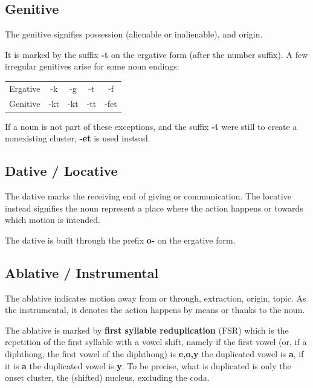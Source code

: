\documentclass[10pt,oneside]{memoir}
\begin{document}
\begin{multicols}{2}
\subsection{Genitive}

The genitive signifies possession (alienable or inalienable), and origin.

It is marked by the suffix \textbf{-t} on the ergative form (after the number suffix). A few irregular genitives arise for some noun endings:

\begin{center}
\begin{tabular}{c || c | c | c | c}
Ergative & -k & -g & -t & -f\\
Genitive & -kt & -kt & -tt & -fet
\end{tabular}
\end{center}



If a noun is not part of these exceptions, and the suffix \textbf{-t} were still to create a nonexisting cluster, \textbf{-et} is used instead.

\subsection{Dative / Locative}

The dative marks the receiving end of giving or communication. The locative instead signifies the noun represent a place where the action happens or towards which motion is intended.

The dative is built through the prefix \textbf{o-} on the ergative form.

\subsection{Ablative / Instrumental}

The ablative indicates motion away from or through, extraction, origin, topic. As the instrumental, it denotes the action happens by means or thanks to the noun.

The ablative is marked by \textbf{first syllable reduplication} (FSR) which is the repetition of the first syllable with a vowel shift, namely if the first vowel (or, if a diphthong, the first vowel of the diphthong) is \textbf{e,o,y} the duplicated vowel is \textbf{a}, if it is \textbf{a} the duplicated vowel is \textbf{y}. To be precise, what is duplicated is only the onset cluster, the (shifted) nucleus, excluding the coda.


\end{multicols}
\end{document}
